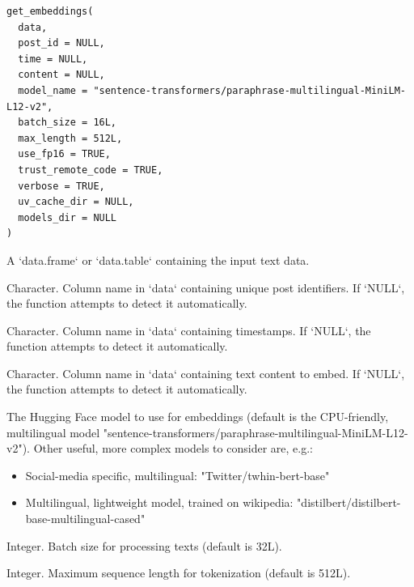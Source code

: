 \documentclass[a4paper]{book}
\begin{document}
%
\begin{Usage}
\begin{verbatim}
get_embeddings(
  data,
  post_id = NULL,
  time = NULL,
  content = NULL,
  model_name = "sentence-transformers/paraphrase-multilingual-MiniLM-L12-v2",
  batch_size = 16L,
  max_length = 512L,
  use_fp16 = TRUE,
  trust_remote_code = TRUE,
  verbose = TRUE,
  uv_cache_dir = NULL,
  models_dir = NULL
)
\end{verbatim}
\end{Usage}
%
\begin{Arguments}
\begin{ldescription}
\item[\code{data}] A `data.frame` or `data.table` containing the input text data.

\item[\code{post\_id}] Character. Column name in `data` containing unique post identifiers. If `NULL`, 
the function attempts to detect it automatically.

\item[\code{time}] Character. Column name in `data` containing timestamps. If `NULL`, the function 
attempts to detect it automatically.

\item[\code{content}] Character. Column name in `data` containing text content to embed. If `NULL`, 
the function attempts to detect it automatically.

\item[\code{model\_name}] The Hugging Face model to use for embeddings (default is the CPU-friendly, multilingual model "sentence-transformers/paraphrase-multilingual-MiniLM-L12-v2").
Other useful, more complex models to consider are, e.g.:
\begin{itemize}

\item{} Social-media specific, multilingual: "Twitter/twhin-bert-base"
\item{} Multilingual, lightweight model, trained on wikipedia: "distilbert/distilbert-base-multilingual-cased"

\end{itemize}


\item[\code{batch\_size}] Integer. Batch size for processing texts (default is 32L).

\item[\code{max\_length}] Integer. Maximum sequence length for tokenization (default is 512L).


\end{ldescription}
\end{Arguments}
\end{document}
